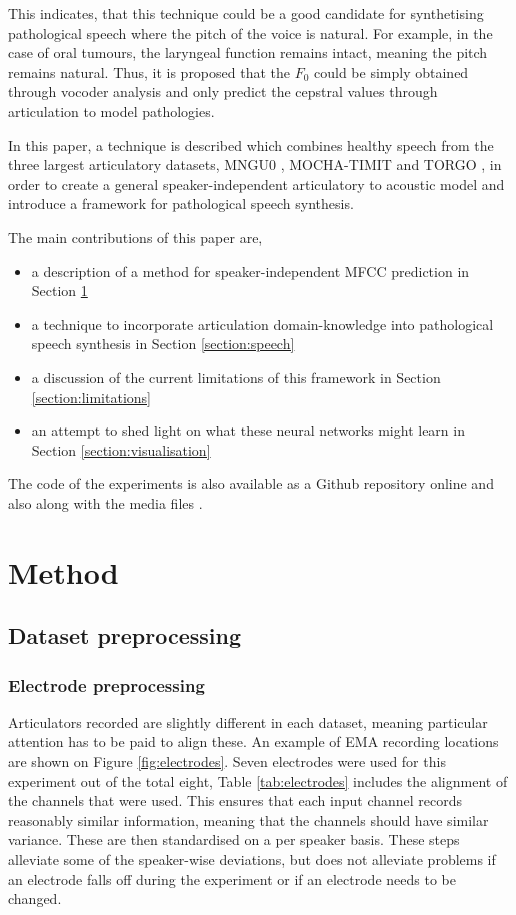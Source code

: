 \documentclass[a4paper]{article}
\begin{document}
This indicates, that this technique could be a good candidate for synthetising
pathological speech where the pitch of the voice is natural. For example,
in the case of oral tumours, the laryngeal function remains intact,
meaning the pitch remains natural. Thus, it is proposed that the \( F_0 \) could
be simply obtained through vocoder analysis and only predict the cepstral
values through articulation to model pathologies.

In this paper, a technique is described which combines healthy speech
from the three largest articulatory datasets, MNGU0 \cite{Richmond2011},
MOCHA-TIMIT and TORGO \cite{Rudzicz2012}, in order to
create a general speaker-independent articulatory to acoustic model and
introduce a framework for pathological speech synthesis.

\noindent The main contributions of this paper are,
\begin{itemize}
\setlength\itemsep{-0.3em}
\item a description of a method for speaker-independent MFCC prediction in Section \ref{section:method}
\item a technique to incorporate articulation domain-knowledge into pathological
  speech synthesis in Section \ref{section:speech} 
\item a discussion of the current limitations of this framework in Section \ref{section:limitations}
\item an attempt to shed light on what these neural networks might learn in Section \ref{section:visualisation}
\end{itemize}

\noindent The code of the experiments is also available as a Github repository online and also
along with the media files \cite{Halpern2019}.

\section{Method} \label{section:method}
\subsection{Dataset preprocessing}

\subsubsection{Electrode preprocessing}

Articulators recorded are slightly different in each dataset, meaning particular attention has to be paid to align these. An example of EMA recording locations are shown on Figure \ref{fig:electrodes}. Seven electrodes were used for this experiment out of the total eight, Table \ref{tab:electrodes} includes
the alignment of the channels that were used. This ensures that each
input channel records reasonably similar information, meaning that the
channels should have similar variance. These are then standardised on a per speaker
basis. These steps alleviate some
of the speaker-wise deviations, but does not alleviate problems if an electrode
falls off during the experiment or if an electrode needs to be changed.
\end{document}
